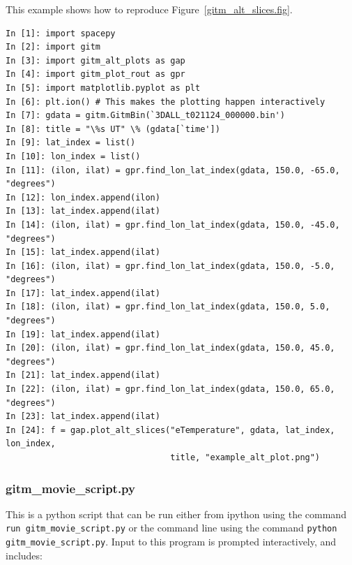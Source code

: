 This example shows how to reproduce Figure~\ref{gitm_alt_slices.fig}.

\begin{verbatim}
In [1]: import spacepy
In [2]: import gitm
In [3]: import gitm_alt_plots as gap
In [4]: import gitm_plot_rout as gpr
In [5]: import matplotlib.pyplot as plt
In [6]: plt.ion() # This makes the plotting happen interactively
In [7]: gdata = gitm.GitmBin(`3DALL_t021124_000000.bin')
In [8]: title = "\%s UT" \% (gdata[`time'])
In [9]: lat_index = list()
In [10]: lon_index = list()
In [11]: (ilon, ilat) = gpr.find_lon_lat_index(gdata, 150.0, -65.0, "degrees")
In [12]: lon_index.append(ilon)
In [13]: lat_index.append(ilat)
In [14]: (ilon, ilat) = gpr.find_lon_lat_index(gdata, 150.0, -45.0, "degrees")
In [15]: lat_index.append(ilat)
In [16]: (ilon, ilat) = gpr.find_lon_lat_index(gdata, 150.0, -5.0, "degrees")
In [17]: lat_index.append(ilat)
In [18]: (ilon, ilat) = gpr.find_lon_lat_index(gdata, 150.0, 5.0, "degrees")
In [19]: lat_index.append(ilat)
In [20]: (ilon, ilat) = gpr.find_lon_lat_index(gdata, 150.0, 45.0, "degrees")
In [21]: lat_index.append(ilat)
In [22]: (ilon, ilat) = gpr.find_lon_lat_index(gdata, 150.0, 65.0, "degrees")
In [23]: lat_index.append(ilat)
In [24]: f = gap.plot_alt_slices("eTemperature", gdata, lat_index, lon_index, 
                                 title, "example_alt_plot.png")
\end{verbatim}

\subsubsection{gitm\_movie\_script.py}

This is a python script that can be run either from ipython using the command {\tt run gitm\_movie\_script.py} or the command line using the command {\tt python gitm\_movie\_script.py}.  Input to this program is prompted interactively, and includes:

